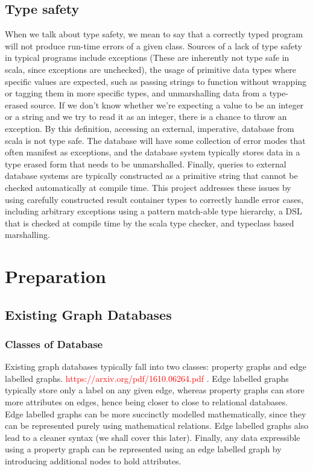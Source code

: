 \documentclass[12pt,a4paper,twoside,openright]{report}
\newcommand\todo[1]{\textcolor{red}{#1}}
\begin{document}
\section{Type safety}
When we talk about type safety, we mean to say that a correctly typed program will not produce run-time errors of a given class. Sources of a lack of  type safety in typical programs include exceptions (These are inherently not type safe in scala, since exceptions are unchecked), the usage of primitive data types where specific values are expected, such as passing strings to function without wrapping or tagging them in more specific types, and unmarshalling data from a type-erased source. If we don’t know whether we’re expecting a value to be an integer or a string and we try to read it as an integer, there is a chance to throw an exception. 
By this definition, accessing an external, imperative, database from scala is not type safe. The database will have some collection of error modes that often manifest as exceptions, and the database system typically stores data in a type erased form that needs to be unmarshalled. Finally, queries to external database systems are typically constructed as a primitive string that cannot be checked automatically at compile time. This project addresses these issues by using carefully constructed result container types to correctly handle error cases, including arbitrary exceptions using a pattern match-able type hierarchy, a DSL that is checked at compile time by the scala type checker, and typeclass based marshalling.

\chapter{Preparation}

\section{Existing Graph Databases}
\subsection{Classes of Database}
Existing graph databases typically fall into two classes: property graphs and edge labelled graphs. \todo{https://arxiv.org/pdf/1610.06264.pdf} . Edge labelled graphs typically store only a label on any given edge, whereas property graphs can store more attributes on edges, hence being closer to close to relational databases. Edge labelled graphs can be more succinctly modelled mathematically, since they can be represented purely using mathematical relations. Edge labelled graphs also lead to a cleaner syntax (we shall cover this later). Finally, any data expressible using a property graph can be represented using an edge labelled graph by introducing additional nodes to hold attributes.
\end{document}
